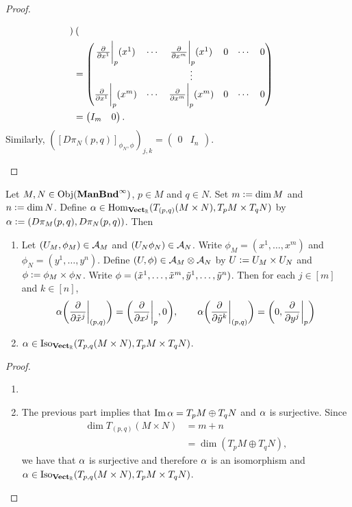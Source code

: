 \documentclass{book}
\begin{document}
\begin{proof}
\begin{enumerate}
\begin{align*}
\begin{pmatrix}
				\end{pmatrix} \\
				& = 
				\begin{pmatrix}
					\frac{\partial}{\partial x^1} \bigg|_p (x^1) & \cdots &  \frac{\partial}{\partial x^m} \bigg|_p (x^1) & 0  & \cdots & 0 \\
					&& \vdots \\
					\frac{\partial}{\partial x^1} \bigg|_p (x^m) & \cdots &  \frac{\partial}{\partial x^m} \bigg|_p (x^m) & 0  & \cdots & 0 \\ 
				\end{pmatrix} \\
				& = 
				\begin{pmatrix}
					I_m & 0 
				\end{pmatrix}. 
			\end{align*}
			Similarly, $([D \pi_N (p,q)]_{\phi_N, \phi})_{j,k} = 
			\begin{pmatrix}
				0 & I_n 
			\end{pmatrix}$.
		\end{enumerate}
	\end{proof}

	\begin{ex} 
			Let $M,N \in \operatorname{Obj}(\operatorname*{\text{\textbf{ManBnd}}^{\infty}})$, $p \in M$ and $q \in N$. Set $m \vcentcolon= \dim M$ and $n \vcentcolon= \dim N$. Define $\alpha \in \operatorname{Hom}_{\operatorname*{\text{\textbf{Vect}}_{\mathbb{R}}}}(T_{(p, q)} (M \times N), T_p M \times T_q N)$ by $\alpha \vcentcolon= (D \pi_{M}(p, q), D \pi_N(p,q))$. Then
			\begin{enumerate}
				\item  Let $(U_M, \phi_M) \in \mathcal{A}_M$ and $(U_N\phi_N) \in \mathcal{A}_N$. Write $\phi_M = (x^1, \ldots, x^m)$ and $\phi_N = (y^1, \ldots, y^n)$. Define $(U, \phi) \in \mathcal{A}_M \otimes \mathcal{A}_N$ by $U \vcentcolon= U_M \times U_N$ and $\phi \vcentcolon= \phi_M \times \phi_N$. Write $\phi = (\tilde{x}^1, \ldots, \tilde{x}^m, \tilde{y}^1, \ldots, \tilde{y}^n)$. Then for each $j \in [m]$ and $k \in [n]$, 
				$$ \alpha \bigg( \frac{\partial}{\partial \tilde{x}^j} \bigg|_{(p,q)} \bigg) = \bigg( \frac{\partial}{\partial x^j} \bigg|_p , 0\bigg), \quad  \quad \alpha \bigg( \frac{\partial}{\partial \tilde{y}^k} \bigg|_{(p,q)} \bigg) = \bigg( 0, \frac{\partial}{\partial y^j} \bigg|_p \bigg)$$
				\item $\alpha \in \operatorname{Iso}_{\operatorname*{\text{\textbf{Vect}}_{\mathbb{R}}}}(T_{p, q} (M \times N), T_p M \times T_q N)$.
			\end{enumerate}		
	\end{ex}

	\begin{proof}\
		\begin{enumerate}
			\item {}
			\item The previous part implies that $\text{Im} \, \alpha = T_pM \oplus T_qN$ and $\alpha$ is surjective. Since 
			\begin{align*}
				\dim T_{(p, q)} (M \times N) 
				& = m + n \\
				& = \dim( T_pM \oplus T_qN),
			\end{align*}
			we have that $\alpha$ is surjective and therefore $\alpha$ is an isomorphism and $\alpha \in \operatorname{Iso}_{\operatorname*{\text{\textbf{Vect}}_{\mathbb{R}}}}(T_{p, q} (M \times N), T_p M \times T_q N)$. 
		\end{enumerate}
	\end{proof}
\end{document}
